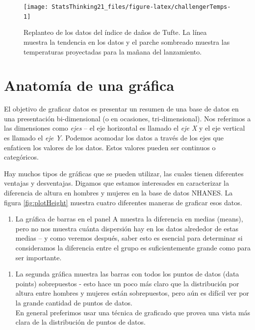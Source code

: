 \documentclass[
  12pt,
]{book}
\providecommand{\tightlist}{%
  \setlength{\itemsep}{0pt}\setlength{\parskip}{0pt}}
\begin{document}
\begin{figure}
\texttt{[image: StatsThinking21\_files/figure-latex/challengerTemps-1]} \caption{Replanteo de los datos del índice de daños de Tufte. La línea muestra la tendencia en los datos y el parche sombreado muestra las temperaturas proyectadas para la mañana del lanzamiento.}\label{fig:challengerTemps}
\end{figure}

\hypertarget{anatomuxeda-de-una-gruxe1fica}{%
\section{Anatomía de una gráfica}\label{anatomuxeda-de-una-gruxe1fica}}

El objetivo de graficar datos es presentar un resumen de una base de datos en una presentación bi-dimensional (o en ocasiones, tri-dimensional). Nos referimos a las dimensiones como \emph{ejes} -- el eje horizontal es llamado el \emph{eje X} y el eje vertical es llamado el \emph{eje Y}. Podemos acomodar los datos a través de los ejes que enfaticen los valores de los datos. Estos valores pueden ser continuos o categóricos.

Hay muchos tipos de gráficas que se pueden utilizar, las cuales tienen diferentes ventajas y desventajas. Digamos que estamos interesades en caracterizar la diferencia de altura en hombres y mujeres en la base de datos NHANES. La figura \ref{fig:plotHeight} muestra cuatro diferentes maneras de graficar esos datos.

\begin{enumerate}
\def\labelenumi{\arabic{enumi}.}
\tightlist
\item
  La gráfica de barras en el panel A muestra la diferencia en medias (means), pero no nos muestra cuánta dispersión hay en los datos alrededor de estas medias -- y como veremos después, saber esto es esencial para determinar si consideramos la diferencia entre el grupo es suficientemente grande como para ser importante.
\end{enumerate}

\begin{enumerate}
\def\labelenumi{\arabic{enumi}.}
\setcounter{enumi}{1}
\tightlist
\item
  La segunda gráfica muestra las barras con todos los puntos de datos (data points) sobrepuestos - esto hace un poco más claro que la distribución por altura entre hombres y mujeres están sobrepuestos, pero aún es difícil ver por la grande cantidad de puntos de datos.\\
  En general preferimos usar una técnica de graficado que provea una vista más clara de la distribución de puntos de datos.
\end{enumerate}
\end{document}
